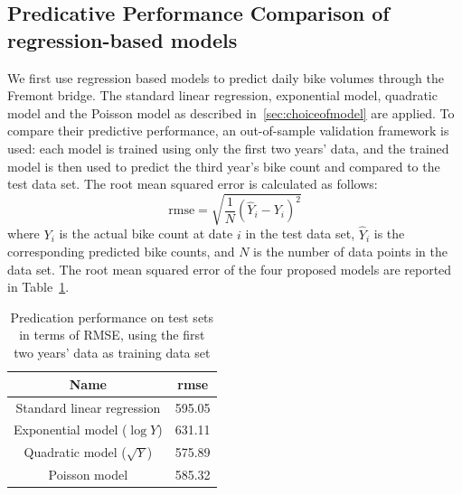 \documentclass [11pt, proquest] {uwthesis}[2015/03/03]
\begin{document}
\subsection{Predicative Performance Comparison of regression-based models}
We first use regression based models to predict daily bike volumes through the Fremont bridge. The standard linear regression, exponential model, quadratic model and the Poisson model as described in~\ref{sec:choiceofmodel} are applied. To compare their predictive performance, an out-of-sample validation framework is used: each model is trained using only the first two years' data, and the trained model is then used to predict the third year's bike count and compared to the test data set. The root mean squared error is calculated as follows:
\begin{equation*}
\text{rmse} = \sqrt{\frac{1}{N}(\hat{Y}_i - Y_i)^2}
\end{equation*}
where $Y_i$ is the actual bike count at date $i$ in the test data set, $\hat{Y}_i$ is the corresponding predicted bike counts, and $N$ is the number of data points in the data set. The root mean squared error of the four proposed models are reported in Table~\ref{tbl:pred4model}.

\begin{table}
 \centering 
  \label{tbl:pred4model} 
\small
\begin{tabular}{ c | c } 
\hline 
  Name & rmse \\ 
\hline
  Standard linear regression & 595.05  \\ 
  Exponential model ($\log{Y}$) & 631.11 \\ 
  Quadratic model ($\sqrt{Y}$) & 575.89\\ 
  Poisson model & 585.32 \\
\hline 
\end{tabular} 
\caption{Predication performance on test sets in terms of RMSE, using the first two years' data as training data set} 
\end{table} 

\end{document}
